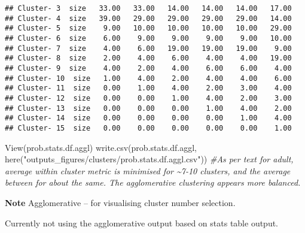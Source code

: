 \documentclass[
]{article}
\newenvironment{Shaded}{\begin{snugshade}}{\end{snugshade}}
\newcommand{\CommentTok}[1]{\textcolor[rgb]{0.56,0.35,0.01}{\textit{#1}}}
\newcommand{\FunctionTok}[1]{\textcolor[rgb]{0.00,0.00,0.00}{#1}}
\newcommand{\NormalTok}[1]{#1}
\newcommand{\StringTok}[1]{\textcolor[rgb]{0.31,0.60,0.02}{#1}}
\begin{document}
\begin{verbatim}
## Cluster- 3  size   33.00   33.00   14.00   14.00   14.00   17.00
## Cluster- 4  size   39.00   29.00   29.00   29.00   29.00   14.00
## Cluster- 5  size    9.00   10.00   10.00   10.00   10.00   29.00
## Cluster- 6  size    6.00    9.00    9.00    9.00    9.00   10.00
## Cluster- 7  size    4.00    6.00   19.00   19.00   19.00    9.00
## Cluster- 8  size    2.00    4.00    6.00    4.00    4.00   19.00
## Cluster- 9  size    4.00    2.00    4.00    6.00    6.00    4.00
## Cluster- 10  size   1.00    4.00    2.00    4.00    4.00    6.00
## Cluster- 11  size   0.00    1.00    4.00    2.00    3.00    4.00
## Cluster- 12  size   0.00    0.00    1.00    4.00    2.00    3.00
## Cluster- 13  size   0.00    0.00    0.00    1.00    4.00    2.00
## Cluster- 14  size   0.00    0.00    0.00    0.00    1.00    4.00
## Cluster- 15  size   0.00    0.00    0.00    0.00    0.00    1.00
\end{verbatim}

\begin{Shaded}
\begin{Highlighting}[]
\FunctionTok{View}\NormalTok{(prob.stats.df.aggl)}
\FunctionTok{write.csv}\NormalTok{(prob.stats.df.aggl, }\FunctionTok{here}\NormalTok{(}\StringTok{"outputs\_figures/clusters/prob.stats.df.aggl.csv"}\NormalTok{))}
\CommentTok{\#As per text for adult, average within cluster metric is minimised for \textasciitilde{}7{-}10 clusters, and the average between for about the same. The agglomerative clustering appears more balanced.}
\end{Highlighting}
\end{Shaded}

\textbf{Note} Agglomerative -- for visualising cluster number selection.

Currently not using the agglomerative output based on stats table
output.
\end{document}

